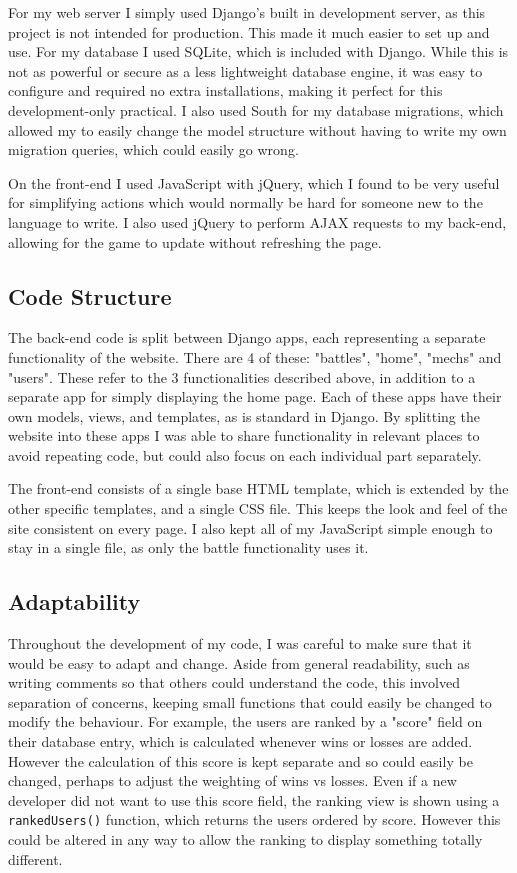 \documentclass{article}
\begin{document}
For my web server I simply used Django's built in development server, as this project is not intended for production. This made it much easier to set up and use. For my database I used SQLite, which is included with Django. While this is not as powerful or secure as a less lightweight database engine, it was easy to configure and required no extra installations, making it perfect for this development-only practical. I also used South for my database migrations, which allowed my to easily change the model structure without having to write my own migration queries, which could easily go wrong.

On the front-end I used JavaScript with jQuery, which I found to be very useful for simplifying actions which would normally be hard for someone new to the language to write. I also used jQuery to perform AJAX requests to my back-end, allowing for the game to update without refreshing the page.

\subsection{Code Structure}

The back-end code is split between Django apps, each representing a separate functionality of the website. There are 4 of these: "battles", "home", "mechs" and "users". These refer to the 3 functionalities described above, in addition to a separate app for simply displaying the home page. Each of these apps have their own models, views, and templates, as is standard in Django. By splitting the website into these apps I was able to share functionality in relevant places to avoid repeating code, but could also focus on each individual part separately.

The front-end consists of a single base HTML template, which is extended by the other specific templates, and a single CSS file. This keeps the look and feel of the site consistent on every page. I also kept all of my JavaScript simple enough to stay in a single file, as only the battle functionality uses it.

\subsection{Adaptability}

Throughout the development of my code, I was careful to make sure that it would be easy to adapt and change. Aside from general readability, such as writing comments so that others could understand the code, this involved separation of concerns, keeping small functions that could easily be changed to modify the behaviour. For example, the users are ranked by a "score" field on their database entry, which is calculated whenever wins or losses are added. However the calculation of this score is kept separate and so could easily be changed, perhaps to adjust the weighting of wins vs losses. Even if a new developer did not want to use this score field, the ranking view is shown using a \texttt{rankedUsers()} function, which returns the users ordered by score. However this could be altered in any way to allow the ranking to display something totally different. 
\end{document}
